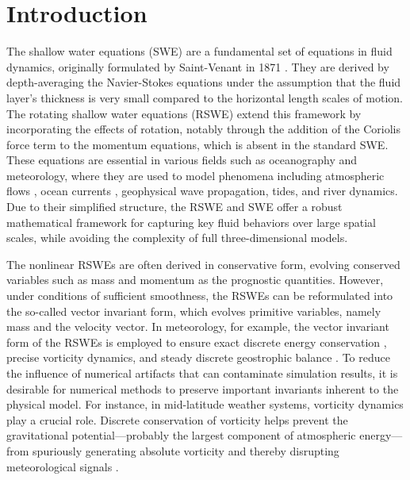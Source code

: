 \documentclass{article}
\numberwithin{equation}{section}
\theoremstyle{definition}
\begin{document}
\section{Introduction}
The shallow water equations (SWE) are a fundamental set of equations in fluid dynamics, originally formulated by Saint-Venant in 1871 \cite{saintvenant1871}. They are derived by depth-averaging the Navier-Stokes equations under the assumption that the fluid layer's thickness is very small compared to the horizontal length scales of motion. The rotating shallow water equations (RSWE) extend this framework by incorporating the effects of rotation, notably through the addition of the Coriolis force term to the momentum equations, which is absent in the standard SWE. These equations are essential in various fields such as oceanography and meteorology, where they are used to model phenomena including atmospheric flows \cite{williamson1992standard,behrens1998atmospheric}, ocean currents \cite{zeitlin2018geophysical}, geophysical wave propagation, tides, and river dynamics. Due to their simplified structure, the RSWE and SWE offer a robust mathematical framework for capturing key fluid behaviors over large spatial scales, while avoiding the complexity of full three-dimensional models.
% 

The nonlinear RSWEs are often derived in conservative form, evolving conserved variables such as mass and momentum as the prognostic quantities. However, under conditions of sufficient smoothness, the RSWEs can be reformulated into the so-called vector invariant form, which evolves primitive variables, namely mass and the velocity vector. In meteorology, for example, the vector invariant form of the RSWEs is employed to ensure exact discrete energy conservation \cite{ricardo2023conservation, thuburn2008some}, precise vorticity dynamics, and steady discrete geostrophic balance \cite{cotter2012mixed, lee2018discrete}. To reduce the influence of numerical artifacts that can contaminate simulation results, it is desirable for numerical methods to preserve important invariants inherent to the physical model. For instance, in mid-latitude weather systems, vorticity dynamics play a crucial role. Discrete conservation of vorticity helps prevent the gravitational potential—probably the largest component of atmospheric energy—from spuriously generating absolute vorticity and thereby disrupting meteorological signals \cite{staniforth2012horizontal}.

% 
\end{document}
